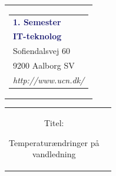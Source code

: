 


% 
\thispagestyle{empty}
\begin{nopagebreak}
{\samepage 

\begin{tabular}{r}
\parbox{\textwidth}{  
\hfill \hspace{2cm} \parbox{8cm}{\begin{tabular}{l} %
{\small \textbf{\textcolor{MidnightBlue}{1. Semester}}}\\
{\small \textbf{\textcolor{MidnightBlue}{IT-teknolog}}}\\ 
{\small \textcolor{NavyBlue}{Sofiendalsvej 60}} \\
{\small \textcolor{NavyBlue}{9200 Aalborg SV}} \\
{\small \textcolor{NavyBlue}{\emph{http://www.ucn.dk/}}}
\end{tabular}}}
\end{tabular}

\begin{tabular}{cc}
\parbox{7cm}{
\begin{description}

\item { Titel:} 

Temperaturændringer på\\ vandledning

\end{description}

\parbox{8cm}{

}}
\end{tabular}}
\end{nopagebreak}
